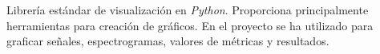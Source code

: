 Librería estándar de visualización en \textit{Python}. Proporciona principalmente herramientas para creación de gráficos. En el proyecto se ha utilizado para graficar señales, espectrogramas, valores de métricas y resultados. 